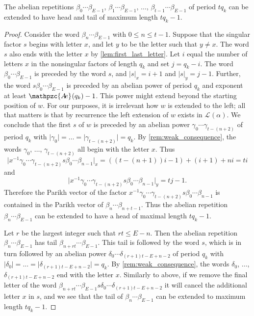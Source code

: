 \documentclass[a4paper,fleqn]{article}
\providecommand{\abs}[1]{\lvert#1\rvert}
\newcommand{\Lang}[2][]{\mathcal{L}_{#1}(#2)}
\newcommand{\abexp}[2][]{\mathpzc{A\mkern-3mu e}_{#1}(#2)}
\begin{document}
  \begin{claim}\label{cl:extension}
    The abelian repetitions $\beta_0 \dotsm \beta_{E-1}$, $\beta_1 \dotsm \beta_{E-1}$, $\ldots$,
    $\beta_{t-1} \dotsm \beta_{E-1}$ of period $tq_k$ can be extended to have head and tail of maximum length
    $tq_k - 1$.
  \end{claim}
  \begin{proof}
    Consider the word $\beta_n \dotsm \beta_{E-1}$ with $0 \leq n \leq t - 1$. Suppose that the singular factor $s$
    begins with letter $x$, and let $y$ to be the letter such that $y \neq x$. The word $s$ also ends with
    the letter $x$ by \autoref{lem:first_last_letter}. Let $i$ equal the number of letters $x$ in the nonsingular
    factors of length $q_k$ and set $j = q_k - i$. The word $\beta_0 \dotsm \beta_{E-1}$ is preceded by the word $s$,
    and $\abs{s}_x = i + 1$ and $\abs{s}_y = j - 1$. Further, the word $s \beta_0 \dotsm \beta_{E-1}$ is preceded by an
    abelian power of period $q_k$ and exponent at least $\abexp{q_k} - 1$. This power might extend beyond the starting
    position of $w$. For our purposes, it is irrelevant how $w$ is extended to the left; all that matters is that by
    recurrence the left extension of $w$ exists in $\Lang{\alpha}$. We conclude that the first $s$ of $w$ is preceded
    by an abelian power $\gamma_0 \dotsm \gamma_{t - (n + 2)}$ of period $q_k$ with
    $\abs{\gamma_0} = \ldots = \abs{\gamma_{t - (n + 2)}} = q_k$. By \autoref{rem:weak_consequence}, the words
    $\gamma_0$, $\ldots$, $\gamma_{t - (n + 2)}$ all begin with the letter $x$. Thus
    \begin{equation*}
      \abs{x^{-1}\gamma_0 \dotsm \gamma_{t - (n + 2)} s \beta_0 \dotsm \beta_{n-1}}_x = ((t - (n + 1))i - 1) + (i + 1) + ni = ti
    \end{equation*}
    and
    \begin{equation*}
      \abs{x^{-1}\gamma_0 \dotsm \gamma_{t - (n + 2)} s \beta_0 \dotsm \beta_{n-1}}_y = tj - 1.
    \end{equation*}
    Therefore the Parikh vector of the factor $x^{-1}\gamma_0 \dotsm \gamma_{t - (n + 2)} s \beta_0 \dotsm \beta_{n-1}$
    is contained in the Parikh vector of $\beta_n \dotsm \beta_{n + t - 1}$. Thus the abelian repetition 
    $\beta_n \dotsm \beta_{E-1}$ can be extended to have a head of maximal length $tq_k - 1$.

    Let $r$ be the largest integer such that $rt \leq E - n$. Then the abelian repetition $\beta_n \dotsm \beta_{E-1}$
    has tail $\beta_{n + rt} \dotsm \beta_{E-1}$. This tail is followed by the word $s$, which is in turn followed by
    an abelian power $\delta_0 \dotsm \delta_{(r+1)t - E + n - 2}$ of period $q_k$ with
    $\abs{\delta_0} = \ldots = \abs{\delta_{(r+1)t - E + n - 2}} = q_k$. By \autoref{rem:weak_consequence}, the words
    $\delta_0$, $\ldots$, $\delta_{(r+1)t - E + n - 2}$ end with the letter $x$. Similarly to above, if we remove the
    final letter of the word $\beta_{n + rt} \dotsm \beta_{E-1} s \delta_0 \dotsm \delta_{(r+1)t - E + n - 2}$ it will
    cancel the additional letter $x$ in $s$, and we see that the tail of $\beta_n \dotsm \beta_{E-1}$ can be extended
    to maximum length $tq_k - 1$.
  \end{proof}
\end{document}
